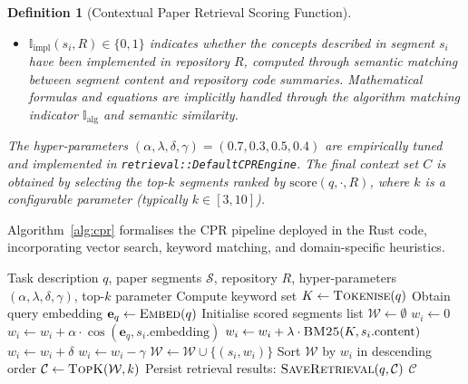 \documentclass{ieeeaccess}
\newtheorem{definition}{Definition}
\begin{document}
\begin{definition}[Contextual Paper Retrieval Scoring Function]
\begin{itemize}
\item \(\mathbb{I}_{\text{impl}}(s_i, R) \in \{0, 1\}\) indicates whether the concepts described in segment \(s_i\) have been implemented in repository \(R\), computed through semantic matching between segment content and repository code summaries. Mathematical formulas and equations are implicitly handled through the algorithm matching indicator \(\mathbb{I}_{\text{alg}}\) and semantic similarity.
\end{itemize}
The hyper-parameters \((\alpha, \lambda, \delta, \gamma) = (0.7, 0.3, 0.5, 0.4)\) are empirically tuned and implemented in \texttt{retrieval::DefaultCPREngine}. The final context set \(C\) is obtained by selecting the top-\(k\) segments ranked by \(\text{score}(q, \cdot, R)\), where \(k\) is a configurable parameter (typically \(k \in [3, 10]\)).
\end{definition}

Algorithm~\ref{alg:cpr} formalises the CPR pipeline deployed in the Rust code, incorporating vector search, keyword matching, and domain-specific heuristics.

\begin{algorithm}[!t]
\caption{Contextual Paper Retrieval (CPR) with Hybrid Scoring}
\label{alg:cpr}
\begin{algorithmic}[1]
\Require Task description \(q\), paper segments \(\mathcal{S}\), repository \(R\), hyper-parameters \((\alpha,\lambda,\delta,\gamma)\), top-\(k\) parameter
\State Compute keyword set \(K \gets \textsc{Tokenise}(q)\) 
\State Obtain query embedding \(\mathbf{e}_q \gets \textsc{Embed}(q)\) 
\State Initialise scored segments list \(\mathcal{W} \gets \emptyset\)
    \State \(w_i \gets 0\) 
        \State \(w_i \gets w_i + \alpha \cdot \cos(\mathbf{e}_q, s_i.\text{embedding})\) 
    \EndIf
    \State \(w_i \gets w_i + \lambda \cdot \textsc{BM25}(K, s_i.\text{content})\) 
        \State \(w_i \gets w_i + \delta\) 
    \EndIf
        \State \(w_i \gets w_i - \gamma\) 
    \EndIf
    \State \(\mathcal{W} \gets \mathcal{W} \cup \{(s_i, w_i)\}\)
\EndFor
\State Sort \(\mathcal{W}\) by \(w_i\) in descending order
\State \(\mathcal{C} \gets \textsc{TopK}(\mathcal{W}, k)\) 
\State Persist retrieval results: \(\textsc{SaveRetrieval}(q, \mathcal{C})\) 
\State \Return \(\mathcal{C}\) 
\end{algorithmic}
\end{algorithm}
\end{document}
